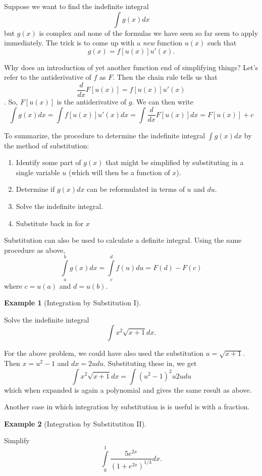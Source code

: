 \documentclass[
  letterpaper,
]{book}
\providecommand{\tightlist}{%
  \setlength{\itemsep}{0pt}\setlength{\parskip}{0pt}}\usepackage{longtable,booktabs,array}
\theoremstyle{definition}
\theoremstyle{definition}
\newtheorem{example}{Example}[chapter]
\theoremstyle{plain}
\theoremstyle{definition}
\theoremstyle{plain}
\theoremstyle{plain}
\theoremstyle{remark}
\begin{document}
Suppose we want to find the indefinite integral \[\int g(x)dx\] but
\(g(x)\) is complex and none of the formulas we have seen so far seem to
apply immediately. The trick is to come up with a \emph{new} function
\(u(x)\) such that \[g(x)=f[u(x)]u'(x).\]

Why does an introduction of yet another function end of simplifying
things? Let's refer to the antiderivative of \(f\) as \(F\). Then the
chain rule tells us that \[\frac{d}{dx} F[u(x)]=f[u(x)]u'(x)\]. So,
\(F[u(x)]\) is the antiderivative of \(g\). We can then write
\[\int g(x) dx= \int f[u(x)]u'(x)dx = \int \frac{d}{dx} F[u(x)]dx = F[u(x)]+c\]

To summarize, the procedure to determine the indefinite integral
\(\int g(x)dx\) by the method of substitution:

\begin{enumerate}
\def\labelenumi{\arabic{enumi}.}
\tightlist
\item
  Identify some part of \(g(x)\) that might be simplified by
  substituting in a single variable \(u\) (which will then be a function
  of \(x\)).
\item
  Determine if \(g(x)dx\) can be reformulated in terms of \(u\) and
  \(du\).
\item
  Solve the indefinite integral.
\item
  Substitute back in for \(x\)
\end{enumerate}

Substitution can also be used to calculate a definite integral. Using
the same procedure as above,
\[\int\limits_a^b g(x)dx=\int\limits_c^d f(u)du = F(d)-F(c)\] where
\(c=u(a)\) and \(d=u(b)\).

\leavevmode{}%
\begin{example}[Integration by Substitution I]\label{exm-intsub1}

Solve the indefinite integral \[\int x^2 \sqrt{x+1}dx.\]

\end{example}

For the above problem, we could have also used the substitution
\(u=\sqrt{x+1}\). Then \(x=u^2-1\) and \(dx=2u du\). Substituting these
in, we get \[\int x^2\sqrt{x+1}dx=\int (u^2-1)^2 u 2u du\] which when
expanded is again a polynomial and gives the same result as above.

Another case in which integration by substitution is is useful is with a
fraction.

\leavevmode{}%
\begin{example}[Integration by Substitutiton II]\label{exm-intsub2}

Simplify \[\int\limits_0^1 \frac{5e^{2x}}{(1+e^{2x})^{1/3}}dx.\]

\end{example}
\end{document}
